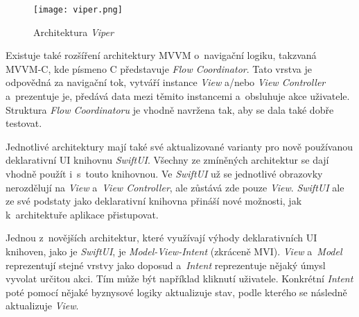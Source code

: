 \begin{figure}[h]
	\centering
	\texttt{[image: viper.png]}
	\caption{Architektura \emph{Viper} \cite{ios-architecture-patterns}}
	\label{fig:viper}
\end{figure}

Existuje také rozšíření architektury MVVM o~navigační logiku, takzvaná MVVM-C, kde písmeno C představuje \emph{Flow Coordinator}. Tato vrstva je odpovědná za navigační tok, vytváří instance \emph{View} a/nebo \emph{View Controller} a~prezentuje je, předává data mezi těmito instancemi a~obsluhuje akce uživatele. Struktura \emph{Flow Coordinatoru} je vhodně navržena tak, aby se dala také dobře testovat. \cite{ios-mvvm-c}

Jednotlivé architektury mají také své aktualizované varianty pro nově používanou deklarativní UI knihovnu \emph{SwiftUI}. Všechny ze zmíněných architektur se dají vhodně použít i~s~touto knihovnou. Ve \emph{SwiftUI} už se jednotlivé obrazovky nerozdělují na \emph{View} a~\emph{View Controller}, ale zůstává zde pouze \emph{View}. \emph{SwiftUI} ale ze své podstaty jako deklarativní knihovna přináší nové možnosti, jak k~architektuře aplikace přistupovat.

Jednou z~novějších architektur, které využívají výhody deklarativních UI knihoven, jako je \emph{SwiftUI}, je \emph{Model-View-Intent} (zkráceně MVI). \emph{View} a~\emph{Model} reprezentují stejné vrstvy jako doposud a~\emph{Intent} reprezentuje nějaký úmysl vyvolat určitou akci. Tím může být například kliknutí uživatele. Konkrétní \emph{Intent} poté pomocí nějaké byznysové logiky aktualizuje stav, podle kterého se následně aktualizuje \emph{View}. \cite{swiftui-mvi}


